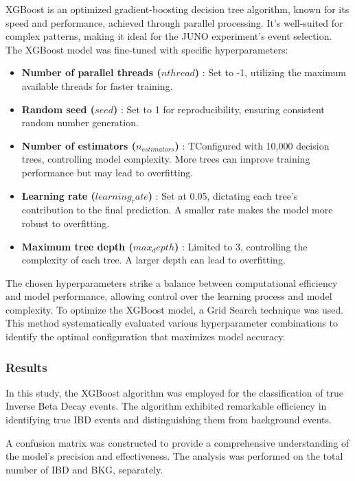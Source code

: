 
XGBoost is an optimized gradient-boosting decision tree algorithm, known for its speed and performance, achieved through parallel processing. It's well-suited for complex patterns, making it ideal for the JUNO experiment's event selection.
The XGBoost model was fine-tuned with specific hyperparameters:

\begin{itemize}
	\item  \textbf{Number of parallel threads ($nthread$)} :  Set to -1, utilizing the maximum available threads for faster training.
	\item  \textbf{Random seed ($seed$)} : Set to 1 for reproducibility, ensuring consistent random number generation.
	\item  \textbf{Number of estimators ($n_{estimators}$)} : TConfigured with 10,000 decision trees, controlling model complexity. More trees can improve training performance but may lead to overfitting.
	\item  \textbf{Learning rate ($learning_rate$)} : Set at 0.05, dictating each tree's contribution to the final prediction. A smaller rate makes the model more robust to overfitting.
	\item  \textbf{Maximum tree depth ($max_depth$)} : Limited to 3, controlling the complexity of each tree. A larger depth can lead to overfitting.
\end{itemize}
The chosen hyperparameters strike a balance between computational efficiency and model performance, allowing control over the learning process and model complexity. To optimize the XGBoost model, a Grid Search technique was used. This method systematically evaluated various hyperparameter combinations to identify the optimal configuration that maximizes model accuracy.



\subsubsection{Results}
In this study, the XGBoost algorithm was employed for the classification of true Inverse Beta Decay events. The algorithm exhibited remarkable efficiency in identifying true IBD events and distinguishing them from background events.

A confusion matrix was constructed to provide a comprehensive understanding of the model's precision and effectiveness. The analysis was performed on the total number of IBD and BKG, separately.

